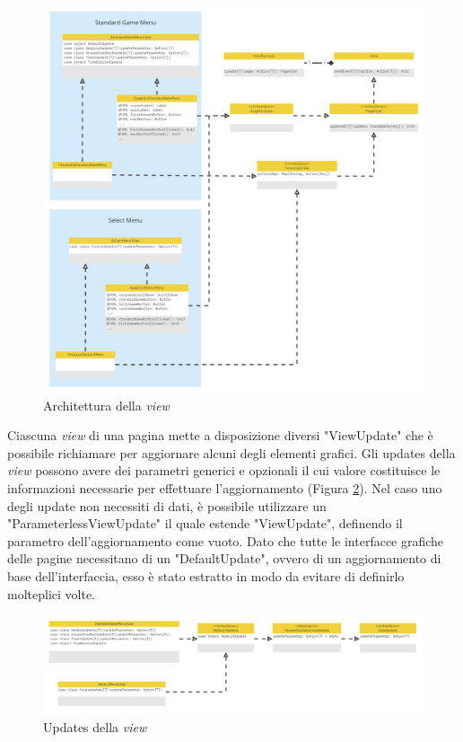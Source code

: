     \begin{figure}[H]
        \centering
        \includegraphics[width=\textwidth]{Miro/view.png}
        \caption{Architettura della \textit{view}}
        \label{fig:view-dettaglio}
    \end{figure}

    Ciascuna \textit{view} di una pagina mette a disposizione diversi "ViewUpdate" che è possibile richiamare per aggiornare alcuni degli elementi grafici. Gli updates della \textit{view} possono avere dei parametri generici e opzionali il cui valore costituisce le informazioni necessarie per effettuare l'aggiornamento (Figura \ref{fig:view-updates}). Nel caso uno degli update non necessiti di dati, è possibile utilizzare un "ParameterlessViewUpdate" il quale estende "ViewUpdate", definendo il parametro dell'aggiornamento come vuoto. Dato che tutte le interfacce grafiche delle pagine necessitano di un "DefaultUpdate", ovvero di un aggiornamento di base dell'interfaccia, esso è stato estratto in modo da evitare di definirlo molteplici volte.
    
    \begin{figure}[H]
        \centering
        \includegraphics[width=\textwidth]{Miro/updates_view.png}
        \caption{Updates della \textit{view}}
        \label{fig:view-updates}
    \end{figure}
    

